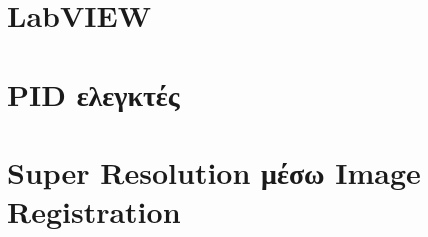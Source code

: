 \documentclass[a4paper,11pt,twoside]{book}
\author{\me}
\begin{document}
\setcounter{page}{3}



\clearemptydoublepage



\clearemptydoublepage



\clearemptydoublepage



\clearemptydoublepage



\clearemptydoublepage

\pagestyle{fancy}

\tableofcontents
\clearemptydoublepage

\setcounter{page}{1}


\clearemptydoublepage

\chapter{LabVIEW}\label{ch:chap1}

\clearemptydoublepage

\chapter{PID ελεγκτές}\label{ch:chap2}

\clearemptydoublepage

\chapter{Super Resolution μέσω Image Registration}\label{ch:chap3}

\clearemptydoublepage


\clearemptydoublepage


\end{document}
